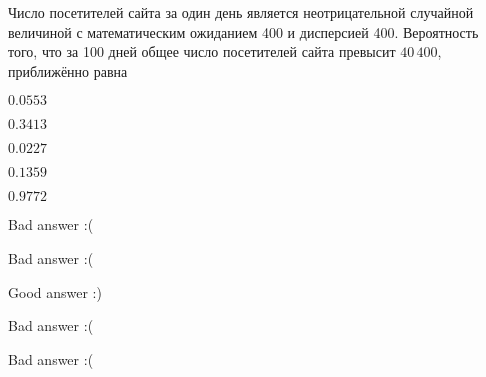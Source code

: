 
\begin{question}
Число посетителей сайта за один день является неотрицательной случайной
величиной с математическим ожиданием 400 и дисперсией 400. Вероятность
того, что за 100 дней общее число посетителей сайта превысит
\(40\,400\), приближённо равна
\begin{answerlist}
  \item \(0.0553\)
  \item \(0.3413\)
  \item \(0.0227\)
  \item \(0.1359\)
  \item \(0.9772\)
\end{answerlist}
\end{question}

\begin{solution}
\begin{answerlist}
  \item Bad answer :(
  \item Bad answer :(
  \item Good answer :)
  \item Bad answer :(
  \item Bad answer :(
\end{answerlist}
\end{solution}

